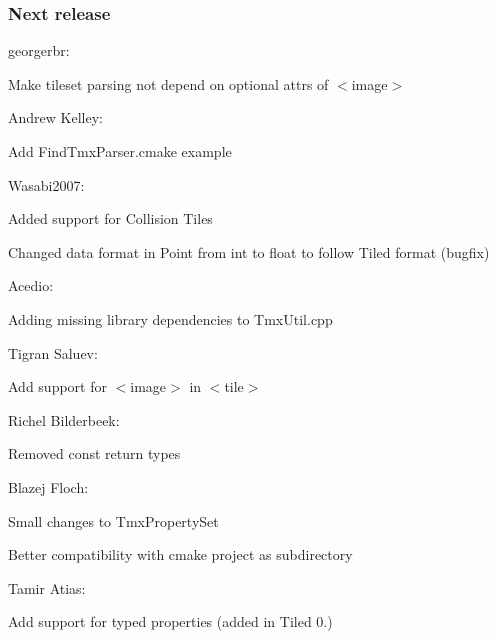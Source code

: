 \subsubsection*{Next release}


\begin{DoxyItemize}
\item georgerbr\-:
\begin{DoxyItemize}
\item Make tileset parsing not depend on optional attrs of $<$image$>$
\end{DoxyItemize}
\item Andrew Kelley\-:
\begin{DoxyItemize}
\item Add Find\-Tmx\-Parser.\-cmake example
\end{DoxyItemize}
\item Wasabi2007\-:
\begin{DoxyItemize}
\item Added support for Collision Tiles
\item Changed data format in Point from int to float to follow Tiled format (bugfix)
\end{DoxyItemize}
\item Acedio\-:
\begin{DoxyItemize}
\item Adding missing library dependencies to Tmx\-Util.\-cpp
\end{DoxyItemize}
\item Tigran Saluev\-:
\begin{DoxyItemize}
\item Add support for $<$image$>$ in $<$tile$>$
\end{DoxyItemize}
\item Richel Bilderbeek\-:
\begin{DoxyItemize}
\item Removed const return types
\end{DoxyItemize}
\item Blazej Floch\-:
\begin{DoxyItemize}
\item Small changes to Tmx\-Property\-Set
\item Better compatibility with cmake project as subdirectory
\end{DoxyItemize}
\item Tamir Atias\-:
\begin{DoxyItemize}
\item Add support for typed properties (added in Tiled 0.)

\end{DoxyItemize}
\end{DoxyItemize}
